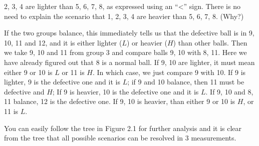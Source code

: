 
2, 3, 4 are lighter than 5, 6, 7, 8, as expressed using an ``<'' sign. There is no need to
explain the scenario that 1, 2, 3, 4 are heavier than 5, 6, 7, 8. (Why?\footnotemark[4])

If the two groups balance, this immediately tells us that the defective ball is in 9, 10, 11
and 12, and it is either lighter (\(L\)) or heavier (\(H\)) than other balls. Then we take 9,
10 and 11 from group 3 and compare balls 9, 10 with 8, 11. Here we have already figured out
that 8 is a normal ball. If 9, 10 are lighter, it must mean either 9 or 10 is \(L\) or 11 is
\(H\). In which case, we just compare 9 with 10. If 9 is lighter, 9 is the defective one and
it is \(L\); if 9 and 10 balance, then 11 must be defective and \(H\); If 9 is heavier, 10 is
the defective one and it is \(L\). If 9, 10 and 8, 11 balance, 12 is the defective one. If 9,
10 is heavier, than either 9 or 10 is \(H\), or 11 is \(L\).

You can easily follow the tree in Figure 2.1 for further analysis and it is clear from the
tree that all possible scenarios can be resolved in 3 measurements.

